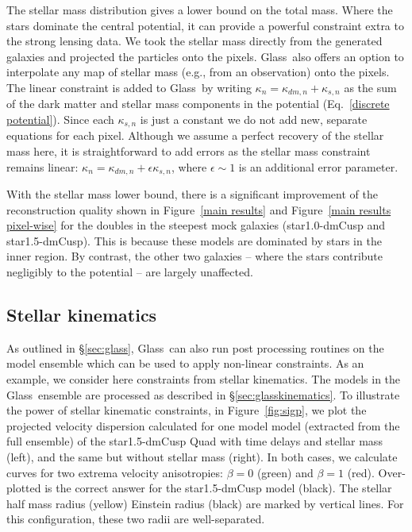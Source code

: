 \documentclass[galley,usenatbib]{mn2e}
\newcommand{\Glass}{{\sc Glass}}
\newcommand{\figref}[1] {Figure~\ref{#1}}
\newcommand{\eqnrefp}[1] {(Eq.~\ref{#1})}
\newcommand{\mockAC}{{\sc star1.0-dmCusp}}
\newcommand{\mockBC}{{\sc star1.5-dmCusp}}
\begin{document}
The stellar mass distribution gives a lower bound on the total mass. Where the
stars dominate the central potential, it can provide a powerful constraint
extra to the strong lensing data. We took the stellar mass directly from the
generated galaxies and projected the particles onto the pixels. \Glass\ also
offers an option to interpolate any map of stellar mass (e.g., from an
observation) onto the pixels. The linear constraint is added to \Glass\ by
writing $\kappa_n = \kappa_{dm,n} + \kappa_{s,n}$ as the sum of the dark matter
and stellar mass components in the potential \eqnrefp{discrete potential}.
Since each $\kappa_{s,n}$ is just a constant we do not add new, separate
equations for each pixel. Although we assume a perfect recovery of the stellar
mass here, it is straightforward to add errors as the stellar mass constraint
remains linear: $\kappa_n = \kappa_{dm,n} + \epsilon \kappa_{s,n}$, where
$\epsilon \sim 1$ is an additional error parameter. 

With the stellar mass lower bound, there is a significant improvement of the reconstruction
quality shown in \figref{main results} and \figref{main results pixel-wise} for the doubles in the
steepest mock galaxies (\mockAC{} and \mockBC). This is because these models
are dominated by stars in the inner region. By contrast, the other two galaxies
 -- where the stars contribute negligibly to the potential -- are largely unaffected.

\subsection{Stellar kinematics}\label{sec:results_stellar_kinematics}

As outlined in \S\ref{sec:glass}, \Glass\ can also run post processing routines
on the model ensemble which can be used to apply non-linear constraints. As an
example, we consider here constraints from stellar kinematics. The models in
the \Glass\ ensemble are processed as described in \S\ref{sec:glasskinematics}.
To illustrate the power of stellar kinematic constraints, in
\figref{fig:sigp}, we plot the projected velocity dispersion calculated for
one model model (extracted from the full ensemble) of the \mockBC{} Quad with time
delays and stellar mass (left), and the same but without stellar mass (right).
In both cases, we calculate curves
for two extrema velocity anisotropies: $\beta=0$ (green) and $\beta=1$ (red).
Over-plotted is the correct answer for the \mockBC{} model (black). The stellar half
mass radius (yellow) Einstein radius (black) are marked by vertical lines. For
this configuration, these two radii are well-separated.
\end{document}
